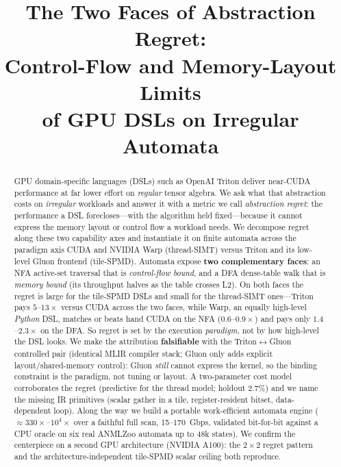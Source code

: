 \documentclass[conference]{IEEEtran}
\begin{document}
\title{The Two Faces of Abstraction Regret:\\
Control-Flow and Memory-Layout Limits\\
of GPU DSLs on Irregular Automata}

\author{
}

\maketitle

\begin{abstract}
GPU domain-specific languages (DSLs) such as OpenAI Triton deliver near-CUDA performance
at far lower effort on \emph{regular} tensor algebra. We ask what that abstraction costs on
\emph{irregular} workloads and answer it with a metric we call \emph{abstraction regret}:
the performance a DSL forecloses---with the algorithm held fixed---because it cannot express
the memory layout or control flow a workload needs. We decompose regret along these two
capability axes and instantiate it on finite automata across the paradigm axis CUDA and
NVIDIA Warp (thread-SIMT) versus Triton and its low-level Gluon frontend (tile-SPMD).
Automata expose \textbf{two complementary faces}: an NFA active-set traversal that is
\emph{control-flow bound}, and a DFA dense-table walk that is \emph{memory bound} (its
throughput halves as the table crosses L2). On both faces the regret is large for the
tile-SPMD DSLs and small for the thread-SIMT ones---Triton pays $5$--$13\times$ versus CUDA
across the two faces, while Warp, an equally high-level \emph{Python} DSL, matches or beats
hand CUDA on the NFA ($0.6$--$0.9\times$) and pays only $1.4$--$2.3\times$ on the DFA. So
regret is set by the execution \emph{paradigm}, not by how
high-level the DSL looks. We make the attribution \textbf{falsifiable} with the
Triton$\leftrightarrow$Gluon controlled pair (identical MLIR compiler stack; Gluon only adds
explicit layout/shared-memory control): Gluon \emph{still} cannot express the kernel, so the
binding constraint is the paradigm, not tuning or layout. A two-parameter cost model
corroborates the regret (predictive for the thread model; holdout 2.7\%) and we name the
missing IR primitives (scalar gather in a tile, register-resident
bitset, data-dependent loop). Along the way we build a portable work-efficient automata engine
($\approx\!330\times$--$10^4\times$ over a faithful full scan, 15--170~Gbps, validated bit-for-bit
against a CPU oracle on six real ANMLZoo automata up to 48k states). We confirm the centerpiece
on a second GPU architecture (NVIDIA A100): the $2\times2$ regret pattern and the
architecture-independent tile-SPMD scalar ceiling both reproduce.
\end{abstract}
\end{document}
